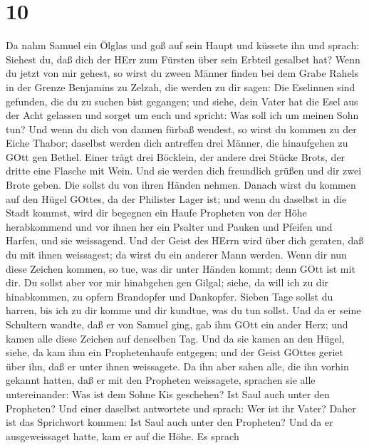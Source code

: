 \hypertarget{section-9}{%
\section{10}\label{section-9}}

 Da nahm Samuel ein Ölglas und goß auf sein Haupt und
küssete ihn und sprach: Siehest du, daß dich der HErr zum Fürsten über
sein Erbteil gesalbet hat?  Wenn du jetzt von mir gehest, so
wirst du zween Männer finden bei dem Grabe Rahels in der Grenze
Benjamins zu Zelzah, die werden zu dir sagen: Die Eselinnen sind
gefunden, die du zu suchen bist gegangen; und siehe, dein Vater hat die
Esel aus der Acht gelassen und sorget um euch und spricht: Was soll ich
um meinen Sohn tun?  Und wenn du dich von dannen fürbaß
wendest, so wirst du kommen zu der Eiche Thabor; daselbst werden dich
antreffen drei Männer, die hinaufgehen zu GOtt gen Bethel. Einer trägt
drei Böcklein, der andere drei Stücke Brots, der dritte eine Flasche mit
Wein.  Und sie werden dich freundlich grüßen und dir zwei
Brote geben. Die sollst du von ihren Händen nehmen.  Danach
wirst du kommen auf den Hügel GOttes, da der Philister Lager ist; und
wenn du daselbst in die Stadt kommst, wird dir begegnen ein Haufe
Propheten von der Höhe herabkommend und vor ihnen her ein Psalter und
Pauken und Pfeifen und Harfen, und sie weissagend.  Und der
Geist des HErrn wird über dich geraten, daß du mit ihnen weissagest; da
wirst du ein anderer Mann werden.  Wenn dir nun diese
Zeichen kommen, so tue, was dir unter Händen kommt; denn GOtt ist mit
dir.  Du sollst aber vor mir hinabgehen gen Gilgal; siehe,
da will ich zu dir hinabkommen, zu opfern Brandopfer und Dankopfer.
Sieben Tage sollst du harren, bis ich zu dir komme und dir kundtue, was
du tun sollst.  Und da er seine Schultern wandte, daß er von
Samuel ging, gab ihm GOtt ein ander Herz; und kamen alle diese Zeichen
auf denselben Tag.  Und da sie kamen an den Hügel, siehe,
da kam ihm ein Prophetenhaufe entgegen; und der Geist GOttes geriet über
ihn, daß er unter ihnen weissagete.  Da ihn aber sahen
alle, die ihn vorhin gekannt hatten, daß er mit den Propheten
weissagete, sprachen sie alle untereinander: Was ist dem Sohne Kis
geschehen? Ist Saul auch unter den Propheten?  Und einer
daselbst antwortete und sprach: Wer ist ihr Vater? Daher ist das
Sprichwort kommen: Ist Saul auch unter den Propheten?  Und
da er ausgeweissaget hatte, kam er auf die Höhe.  Es sprach
